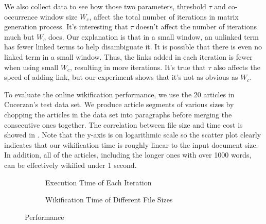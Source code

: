 We also collect data to see how those two parameters, threshold $\tau$ and co-occurrence
window size $W_c$, affect the total number of iterations in matrix generation process.
It's interesting that $\tau$ doesn't affect the number of iterations much but $W_c$ does.
Our explanation is that in a small window, an unlinked term has fewer
linked terms to help disambiguate it.
It is possible that there is even no linked term in a small window.
Thus, the links added in each iteration is fewer when using small $W_c$, resulting in
more iterations. It's true that $\tau$ also affects the speed of adding link, but our
experiment shows that it's not as obvious as $W_c$.


To evaluate the online wikification performance,
we use the 20 articles in Cucerzan's test data set.
We produce article segments of various sizes by chopping the articles in the
data set into paragraphs before merging the consecutive ones together.
The correlation between file size and time cost is showed in
. Note that the y-axis is on logarithmic scale so the
scatter plot clearly indicates that our wikification time is roughly linear
to the input document size. In addition, all of the articles, including the
longer ones with over 1000 words, can be effectively wikified under 1 second.

\begin{figure}[th]
\centering
\begin{subfigure}[t]{0.49\columnwidth}
\centering
{}
\caption{Execution Time of Each Iteration}
\label{fig:itime}
\end{subfigure}
\hfill
\begin{subfigure}[t]{0.49\columnwidth}
\centering
{}
\caption{Wikification Time of Different File Sizes}
\label{fig:etime}
\end{subfigure}
\caption{Performance}
\end{figure}

